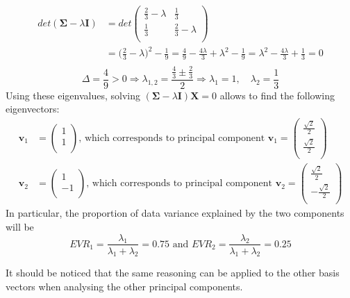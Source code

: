 \documentclass{report}
\begin{document}
\begin{examplebox}
\begin{align*}
        det(\mathbf{\Sigma} - \lambda\mathbf{I})
            &= det\begin{pmatrix}
                \frac{2}{3} - \lambda & \frac{1}{3} \\
                \frac{1}{3} & \frac{2}{3} - \lambda \\
            \end{pmatrix} \\
            &= \Bigg(\frac{2}{3} - \lambda\Bigg)^2 - \frac{1}{9} = \frac{4}{9} - \frac{4\lambda}{3} + \lambda^2 - \frac{1}{9} = \lambda^2 - \frac{4\lambda}{3} + \frac{1}{3} = 0 \\
    \end{align*}
    \[\Delta = \frac{4}{9} > 0 \Rightarrow \lambda_{1, 2} = \frac{\frac{4}{3} \pm \frac{2}{3}}{2} \Rightarrow \lambda_1 = 1, \quad \lambda_2 = \frac{1}{3}\]
    Using these eigenvalues, solving $\displaystyle (\mathbf{\Sigma} - \lambda\mathbf{I})\mathbf{X} = 0$ allows to find the following eigenvectors:
    \begin{align*}
        \mathbf{v}_1
            &= \begin{pmatrix}
                1 \\
                1 \\
            \end{pmatrix} \text{, which corresponds to principal component } \mathbf{v}_1 = \begin{pmatrix}
                \frac{\sqrt{2}}{2} \\
                \frac{\sqrt{2}}{2} \\
            \end{pmatrix} \\
            \mathbf{v}_2 &= \begin{pmatrix}
                1 \\
                -1 \\
            \end{pmatrix} \text{, which corresponds to principal component } \mathbf{v}_2 = \begin{pmatrix}
                \frac{\sqrt{2}}{2} \\
                -\frac{\sqrt{2}}{2} \\
            \end{pmatrix}
    \end{align*}
    In particular, the proportion of data variance explained by the two components will be
    \[EVR_1 = \frac{\lambda_1}{\lambda_1 + \lambda_2} = 0.75 \text{ and } EVR_2 = \frac{\lambda_2}{\lambda_1 + \lambda_2} = 0.25\]
\end{examplebox}
\noindent It should be noticed that the same reasoning can be applied to the other basis vectors when analysing the other principal components.
\end{document}
